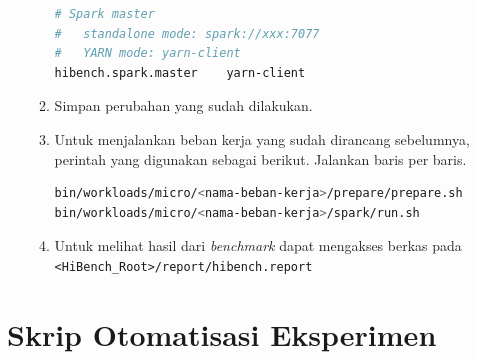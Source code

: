 \begin{enumerate}
\begin{enumerate}
\begin{lstlisting}[language=bash]
# Spark master
#   standalone mode: spark://xxx:7077
#   YARN mode: yarn-client
hibench.spark.master    yarn-client
      \end{lstlisting}
    \item Simpan perubahan yang sudah dilakukan.
    \item Untuk menjalankan beban kerja yang sudah dirancang sebelumnya, perintah yang digunakan sebagai berikut. Jalankan baris per baris.
      \begin{lstlisting}[language=bash]
bin/workloads/micro/<nama-beban-kerja>/prepare/prepare.sh
bin/workloads/micro/<nama-beban-kerja>/spark/run.sh
      \end{lstlisting}
    \item Untuk melihat hasil dari \textit{benchmark} dapat mengakses berkas pada \verb|<HiBench_Root>/report/hibench.report|
  \end{enumerate}
\end{enumerate}






\chapter{Skrip Otomatisasi Eksperimen}
\label{appendix:F}

